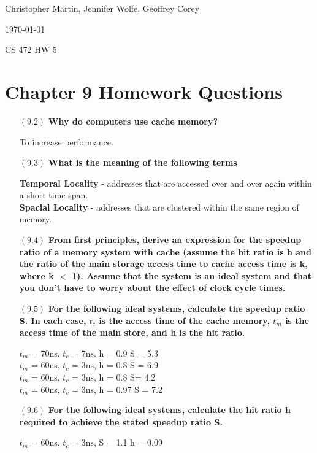 \documentclass[letterpaper,10pt,titlepage]{article}
\def\name{Christopher Martin, Jennifer Wolfe, Geoffrey Corey}
\begin{document}
\hfill \name

\hfill \today

\hfill CS 472 HW 5

\section*{Chapter 9	 Homework Questions}


\begin{enumerate}
\item[$(9.2)$] \textbf{Why do computers use cache memory?}

To increase performance.

\item[$(9.3)$] \textbf{What is the meaning of the following terms}

\textbf{Temporal Locality} - addresses that are accessed over and over again within a short time span.\\
\textbf{Spacial Locality} - addresses that are clustered within the same region of memory.

\item[$(9.4)$] \textbf{From first principles, derive an expression for the speedup ratio of a memory system with cache (assume the hit ratio is h and the ratio of the main storage access time to cache access time is k, where k $<$ 1). Assume that the system is an ideal system and that you don’t have to worry about the effect of clock cycle times.}

\item[$(9.5)$] \textbf{For the following ideal systems, calculate the speedup ratio S. In each case, $t_c$ is the access time of the cache memory, $t_m$ is the access time of the main store, and h is the hit ratio.}

$t_m$ = 70ns, $t_c$ = 7ns, h = 0.9
S = 5.3\\

$t_m $ = 60ns, $t_c$ = 3ns, h = 0.8
S = 6.9\\

$t_m$ = 60ns, $t_c$ = 3ns, h = 0.8
S= 4.2\\

$t_m$ = 60ns, $t_c$ = 3ns, h = 0.97
S = 7.2

\item[$(9.6)$] \textbf{For the following ideal systems, calculate the hit ratio h required to achieve the stated speedup ratio S.}

$t_m$ = 60ns, $t_c$ = 3ns, S = 1.1
h = 0.09\\


\end{enumerate}
\end{document}

